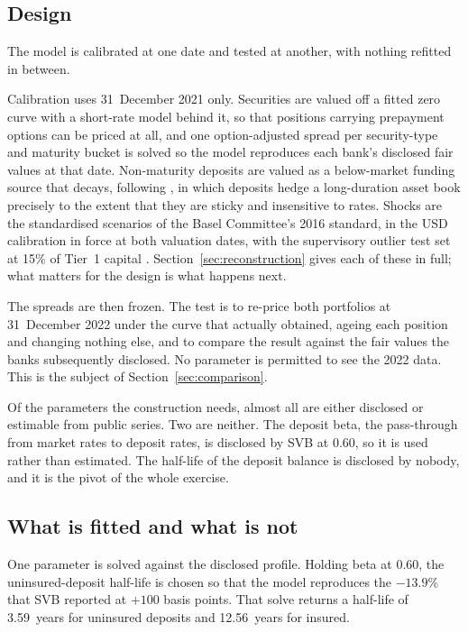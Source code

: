 \subsection{Design}

The model is calibrated at one date and tested at another, with nothing refitted
in between.

Calibration uses 31~December 2021 only. Securities are valued off a fitted zero
curve with a short-rate model behind it, so that positions carrying prepayment
options can be priced at all, and one option-adjusted spread per security-type and
maturity bucket is solved so the model reproduces each bank's disclosed fair values
at that date. Non-maturity deposits are valued as a below-market funding source
that decays, following \citet{Drechsler2021}, in which deposits hedge a
long-duration asset book precisely to the extent that they are sticky and
insensitive to rates. Shocks are the standardised scenarios of the Basel Committee's
2016 standard, in the USD calibration in force at both valuation dates, with the
supervisory outlier test set at 15\% of Tier~1 capital \citep{BCBS2016}.
Section~\ref{sec:reconstruction} gives each of these in full; what matters for the
design is what happens next.

The spreads are then frozen. The test is to re-price both portfolios at
31~December 2022 under the curve that actually obtained, ageing each position and
changing nothing else, and to compare the result against the fair values the banks
subsequently disclosed. No parameter is permitted to see the 2022 data. This is
the subject of Section~\ref{sec:comparison}.

Of the parameters the construction needs, almost all are either disclosed or
estimable from public series. Two are neither. The deposit beta, the pass-through
from market rates to deposit rates, is disclosed by SVB at 0.60, so it is used
rather than estimated. The half-life of the deposit balance is disclosed by nobody,
and it is the pivot of the whole exercise.

\subsection{What is fitted and what is not}

One parameter is solved against the disclosed profile. Holding beta at 0.60, the
uninsured-deposit half-life is chosen so that the model reproduces the $-13.9\%$
that SVB reported at $+100$ basis points. That solve returns a half-life of
3.59~years for uninsured deposits and 12.56~years for insured.

